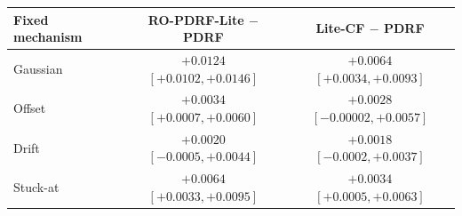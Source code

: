 \begin{tabular}{lcc}
\toprule
Fixed mechanism & RO-PDRF-Lite $-$ PDRF & Lite-CF $-$ PDRF \\
\midrule
Gaussian & $+0.0124$ $[+0.0102,+0.0146]$ & $+0.0064$ $[+0.0034,+0.0093]$ \\
Offset & $+0.0034$ $[+0.0007,+0.0060]$ & $+0.0028$ $[-0.00002,+0.0057]$ \\
Drift & $+0.0020$ $[-0.0005,+0.0044]$ & $+0.0018$ $[-0.0002,+0.0037]$ \\
Stuck-at & $+0.0064$ $[+0.0033,+0.0095]$ & $+0.0034$ $[+0.0005,+0.0063]$ \\
\bottomrule
\end{tabular}
